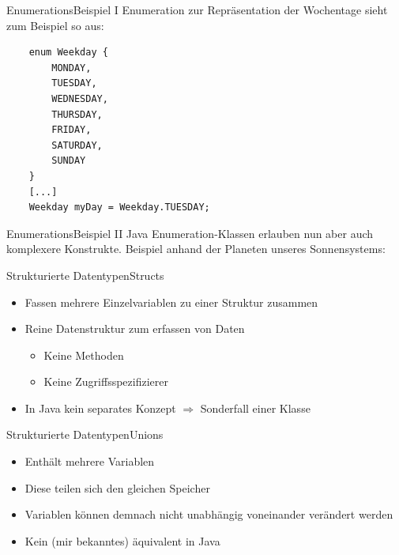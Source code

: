 \begin{frame}[fragile]{Enumerations}{Beispiel I}
Enumeration zur Repräsentation der Wochentage sieht zum Beispiel so aus:
\begin{lstlisting}
	enum Weekday {
		MONDAY,
		TUESDAY,
		WEDNESDAY,
		THURSDAY,
		FRIDAY,
		SATURDAY,
		SUNDAY
	}
	[...]
	Weekday myDay = Weekday.TUESDAY;
\end{lstlisting}
\end{frame}

\begin{frame}{Enumerations}{Beispiel II}
Java Enumeration-Klassen erlauben nun aber auch komplexere Konstrukte. Beispiel anhand der Planeten unseres Sonnensystems:
\end{frame}

\begin{frame}{Strukturierte Datentypen}{Structs}
	\begin{itemize}
		\item Fassen mehrere Einzelvariablen zu einer Struktur zusammen
		\item Reine Datenstruktur zum erfassen von Daten
		\begin{itemize}
			\item Keine Methoden
			\item Keine Zugriffsspezifizierer
		\end{itemize}
		\item In Java kein separates Konzept $\Rightarrow$ Sonderfall einer Klasse
	\end{itemize}
\end{frame}

\begin{frame}{Strukturierte Datentypen}{Unions}
	\begin{itemize}
		\item Enthält mehrere Variablen
		\item Diese teilen sich den gleichen Speicher
		\item Variablen können demnach nicht unabhängig voneinander verändert werden
		\item Kein (mir bekanntes) äquivalent in Java
	\end{itemize}
\end{frame}

